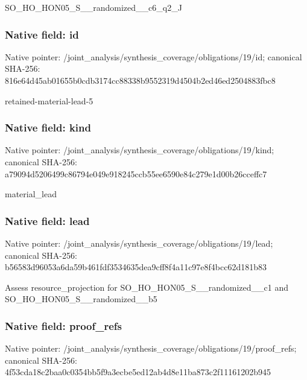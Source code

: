 \documentclass[10pt,a4paper]{article}
\begin{document}
\begingroup\raggedright\sloppy SO\_\allowbreak{}HO\_\allowbreak{}HON05\_\allowbreak{}S\_\allowbreak{}\_\allowbreak{}randomized\_\allowbreak{}\_\allowbreak{}c6\_\allowbreak{}q2\_\allowbreak{}J\par\endgroup

\subsubsection{Native field: id}
Native pointer: /joint\_\allowbreak{}analysis/synthesis\_\allowbreak{}coverage/obligations/19/id; canonical SHA-256: 816e64d45ab01655b0cdb3174cc88338b9552319d4504b2ed46ed2504883fbc8

\begingroup\raggedright\sloppy retained-material-lead-5\par\endgroup

\subsubsection{Native field: kind}
Native pointer: /joint\_\allowbreak{}analysis/synthesis\_\allowbreak{}coverage/obligations/19/kind; canonical SHA-256: a79094d5206499c86794e049e918245ccb55ee6590e84c279e1d00b26cceffc7

\begingroup\raggedright\sloppy material\_\allowbreak{}lead\par\endgroup

\subsubsection{Native field: lead}
Native pointer: /joint\_\allowbreak{}analysis/synthesis\_\allowbreak{}coverage/obligations/19/lead; canonical SHA-256: b56583d96053a6da59b461fdf3534635dea9cff8f4a11c97e8f4bcc62d181b83

\begingroup\raggedright\sloppy Assess resource\_\allowbreak{}projection for SO\_\allowbreak{}HO\_\allowbreak{}HON05\_\allowbreak{}S\_\allowbreak{}\_\allowbreak{}randomized\_\allowbreak{}\_\allowbreak{}c1 and SO\_\allowbreak{}HO\_\allowbreak{}HON05\_\allowbreak{}S\_\allowbreak{}\_\allowbreak{}randomized\_\allowbreak{}\_\allowbreak{}b5\par\endgroup

\subsubsection{Native field: proof\_\allowbreak{}refs}
Native pointer: /joint\_\allowbreak{}analysis/synthesis\_\allowbreak{}coverage/obligations/19/proof\_\allowbreak{}refs; canonical SHA-256: 4f53cda18c2baa0c0354bb5f9a3ecbe5ed12ab4d8e11ba873c2f11161202b945
\end{document}
